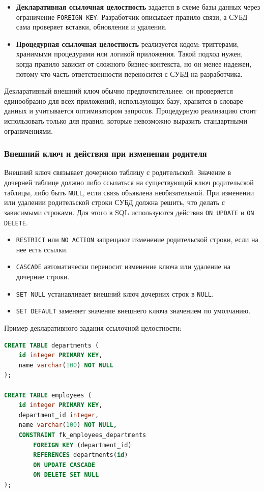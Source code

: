 \begin{itemize}
    \item \textbf{Декларативная ссылочная целостность} задается в схеме базы данных через ограничение \texttt{FOREIGN KEY}. Разработчик описывает правило связи, а СУБД сама проверяет вставки, обновления и удаления.
    \item \textbf{Процедурная ссылочная целостность} реализуется кодом: триггерами, хранимыми процедурами или логикой приложения. Такой подход нужен, когда правило зависит от сложного бизнес-контекста, но он менее надежен, потому что часть ответственности переносится с СУБД на разработчика.
\end{itemize}

Декларативный внешний ключ обычно предпочтительнее: он проверяется единообразно для всех приложений, использующих базу, хранится в словаре данных и учитывается оптимизатором запросов. Процедурную реализацию стоит использовать только для правил, которые невозможно выразить стандартными ограничениями.

\subsubsection{Внешний ключ и действия при изменении родителя}

Внешний ключ связывает дочернюю таблицу с родительской. Значение в дочерней таблице должно либо ссылаться на существующий ключ родительской таблицы, либо быть \texttt{NULL}, если связь объявлена необязательной. При изменении или удалении родительской строки СУБД должна решить, что делать с зависимыми строками. Для этого в SQL используются действия \texttt{ON UPDATE} и \texttt{ON DELETE}.

\begin{itemize}
    \item \texttt{RESTRICT} или \texttt{NO ACTION} запрещают изменение родительской строки, если на нее есть ссылки.
    \item \texttt{CASCADE} автоматически переносит изменение ключа или удаление на дочерние строки.
    \item \texttt{SET NULL} устанавливает внешний ключ дочерних строк в \texttt{NULL}.
    \item \texttt{SET DEFAULT} заменяет значение внешнего ключа значением по умолчанию.
\end{itemize}

Пример декларативного задания ссылочной целостности:
\begin{lstlisting}[language=SQL]
CREATE TABLE departments (
    id integer PRIMARY KEY,
    name varchar(100) NOT NULL
);

CREATE TABLE employees (
    id integer PRIMARY KEY,
    department_id integer,
    name varchar(100) NOT NULL,
    CONSTRAINT fk_employees_departments
        FOREIGN KEY (department_id)
        REFERENCES departments(id)
        ON UPDATE CASCADE
        ON DELETE SET NULL
);
\end{lstlisting}

